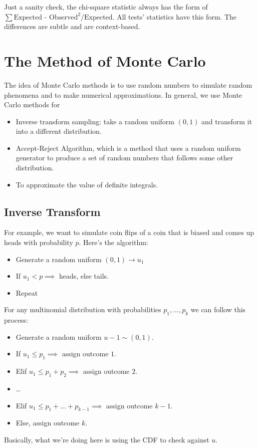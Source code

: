 \documentclass{book}
\theoremstyle{definition}
\begin{document}
Just a sanity check, the chi-square statistic always has the form of $\sum \text{Expected - Observed}^2/\text{Expected}$. All tests' statistics have this form. The differences are subtle and are context-based. 


\section{The Method of Monte Carlo}

The idea of Monte Carlo methods is to use random numbers to simulate random phenomena and to make numerical approximations. In general, we use Monte Carlo methods for
\begin{itemize}
	\item Inverse transform sampling: take a random uniform $(0,1)$ and transform it into a different distribution.
	\item Accept-Reject Algorithm, which is a method that uses a random uniform generator to produce a set of random numbers that follows some other distribution. 
	\item To approximate the value of definite integrals.
\end{itemize}

\subsection{Inverse Transform}

For example, we want to simulate coin flips of a coin that is biased and comes up heads with probability $p$. Here's the algorithm:
\begin{itemize}
	\item Generate a random uniform $(0,1) \to u_1$
	\item If $u_1 < p \implies $ heads, else tails.
	\item Repeat
\end{itemize}

For any multinomial distribution with probabilities $p_1,\dots,p_k$ we can follow this process:
\begin{itemize}
	\item Generate a random uniform $u-1 \sim (0,1)$.
	\item If $u_1 \leq p_1 \implies$ assign outcome $1$.
	\item Elif $u_1 \leq p_1 + p_2 \implies$ assign outcome $2$.
	\item \dots
	\item Elif $u_1 \leq p_1 + \dots + p_{k-1} \implies$ assign outcome $k-1$.
	\item Else, assign outcome $k$. 
\end{itemize}
Basically, what we're doing here is using the CDF to check against $u$. \\
\end{document}
